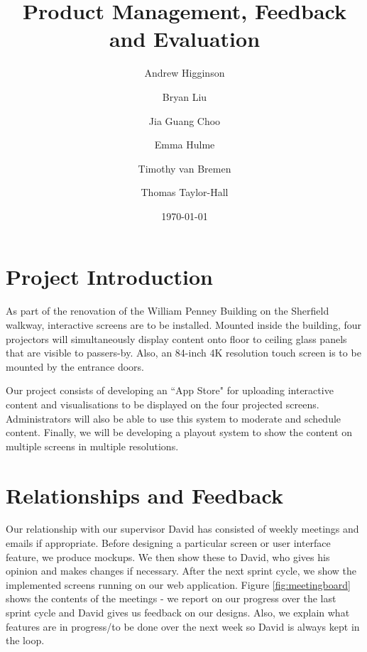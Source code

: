 \documentclass[a4paper]{article}
\begin{document}
\title{Product Management, Feedback and Evaluation}
\author{Andrew Higginson \and Bryan Liu \and Jia Guang Choo \and Emma Hulme \and 
Timothy van Bremen \and Thomas Taylor-Hall}
\date{\today}
\maketitle

\setcounter{table}{0}
\linespread{1.15}

\section{Project Introduction}
As part of the renovation of the William Penney Building on the Sherfield 
walkway, interactive screens are to be installed. Mounted inside the building,
four projectors will simultaneously display content onto floor to ceiling glass
panels that are visible to passers-by. Also, an 84-inch 4K resolution touch 
screen is to be mounted by the entrance doors. 

Our project consists of developing an ``App Store" for uploading interactive 
content and visualisations to be displayed on the four projected screens. 
Administrators will also be able to use this system to moderate and schedule 
content. Finally, we will be developing a playout system to show the content 
on multiple screens in multiple resolutions.

\section{Relationships and Feedback}
Our relationship with our supervisor David has consisted of weekly 
meetings and emails if appropriate. Before designing a particular screen
or user interface feature, we produce mockups. We then show these to 
David, who gives his opinion and makes changes if necessary. After the next 
sprint cycle, we show the implemented screens running on our web application. Figure
\ref{fig:meetingboard} shows the contents of the meetings - we report on our progress 
over the last sprint cycle and David gives us feedback on our designs. Also, we 
explain what features are in progress/to be done over the next week so David is 
always kept in the loop.
\end{document}
